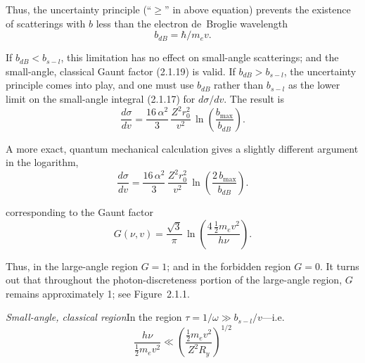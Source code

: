 

Thus, the uncertainty principle (``$\geq$'' in above equation) prevents the existence
of scatterings with $b$ less than the electron de~Broglie wavelength
\begin{equation}
b_{dB} = \hbar / m_e v.
\tag{2.1.20}
\end{equation}

If $b_{dB} < b_{s-l}$, this limitation has no effect on small-angle scatterings; and the
small-angle, classical Gaunt factor (2.1.19) is valid.  If $b_{dB} > b_{s-l}$, the uncertainty
principle comes into play, and one must use $b_{dB}$ rather than $b_{s-l}$ as the lower
limit on the small-angle integral (2.1.17) for $d\sigma/dv$.  The result is
\begin{equation}
\frac{d\sigma}{dv} = \frac{16\,\alpha^2}{3}\,\frac{Z^2 r_0^2}{v^2}\,
\ln\!\left(\frac{b_{\max}}{b_{dB}}\right).
\tag{2.1.21}
\end{equation}

A more exact, quantum mechanical calculation gives a slightly different argument
in the logarithm,
\begin{equation}
\frac{d\sigma}{dv} = \frac{16\,\alpha^2}{3}\,\frac{Z^2 r_0^2}{v^2}\,
\ln\!\left(\frac{2\,b_{\max}}{b_{dB}}\right).
\tag{2.1.22}
\end{equation}

corresponding to the Gaunt factor
\begin{equation}
G(\nu,v) = \frac{\sqrt{3}}{\pi}\,
\ln\!\left(\frac{4\,\frac{1}{2}m_e v^2}{h\nu}\right).
\tag{2.1.23}
\end{equation}

Thus, in the large-angle region $G = 1$; and in the forbidden region $G = 0$.  It turns
out that throughout the photon-discreteness portion of the large-angle region,
$G$ remains approximately 1; see Figure~2.1.1.

\textit{Small-angle, classical region}\quad In the region $\tau = 1/\omega \gg b_{s-l}/v$---i.e.
\begin{equation}
\frac{h\nu}{\frac{1}{2}m_e v^2}
\ll \left(\frac{\frac{1}{2}m_e v^2}{Z^2 R_y}\right)^{1/2}
\tag{2.1.14}
\end{equation}

